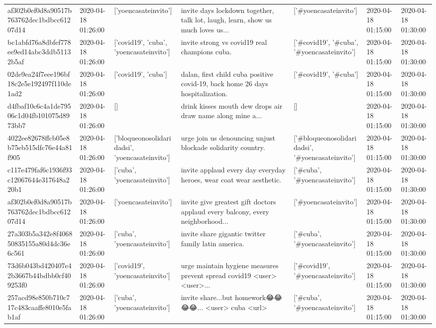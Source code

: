 \begin{tabular}{lllllll}
af302b0ef0d8a90517b763762dec1bdbcc61207d14 & 2020-04-18 01:26:00 & ['yoencasateinvito'] & invite days lockdown together, talk lot, laugh, learn, show us much loves us... & ['#yoencasateinvito'] & 2020-04-18 01:15:00 & 2020-04-18 01:30:00 \\
bc1abfd76a8dbfef778ee9ed14abc3ddb51132b5af & 2020-04-18 01:26:00 & ['covid19', 'cuba', 'yoencasateinvito'] & invite strong vs covid19 real champions cuba. & ['#covid19', '#cuba', '#yoencasateinvito'] & 2020-04-18 01:15:00 & 2020-04-18 01:30:00 \\
02de9ea24f7eee196bf18c2e5e192497f110de1ad2 & 2020-04-18 01:26:00 & ['covid19', 'cuba'] & dalan, first child cuba positive covid-19, back home 26 days hospitalization. & ['#covid19', '#cuba'] & 2020-04-18 01:15:00 & 2020-04-18 01:30:00 \\
d4fbaf10c6c4a1de79506c1d04fb101075d8973bb7 & 2020-04-18 01:26:00 & [] & drink kisses mouth dew drops air draw name along mine a... & [] & 2020-04-18 01:15:00 & 2020-04-18 01:30:00 \\
4022ee82678ffcb05e8b75eb515dfc76e44a81f905 & 2020-04-18 01:26:00 & ['bloqueonosolidaridadsi', 'yoencasateinvito'] & urge join us denouncing unjust blockade solidarity country. & ['#bloqueonosolidaridadsi', '#yoencasateinvito'] & 2020-04-18 01:15:00 & 2020-04-18 01:30:00 \\
c117e479faf6c1936f93c12067644e317648a220b1 & 2020-04-18 01:26:00 & ['cuba', 'yoencasateinvito'] & invite applaud every day everyday heroes, wear coat wear aesthetic. & ['#cuba', '#yoencasateinvito'] & 2020-04-18 01:15:00 & 2020-04-18 01:30:00 \\
af302b0ef0d8a90517b763762dec1bdbcc61207d14 & 2020-04-18 01:26:00 & ['yoencasateinvito'] & invite give greatest gift doctors applaud every balcony, every neighborhood... & ['#yoencasateinvito'] & 2020-04-18 01:15:00 & 2020-04-18 01:30:00 \\
27a303b5a342e8f406850835155a80d4dc36e6c561 & 2020-04-18 01:26:00 & ['cuba', 'yoencasateinvito'] & invite share gigantic twitter family latin america. & ['#cuba', '#yoencasateinvito'] & 2020-04-18 01:15:00 & 2020-04-18 01:30:00 \\
73d6b043bd420407e42b3667b44bdbb0cf409253f0 & 2020-04-18 01:26:00 & ['covid19', 'yoencasateinvito'] & urge maintain hygiene measures prevent spread covid19 <user> <user>... & ['#covid19', '#yoencasateinvito'] & 2020-04-18 01:15:00 & 2020-04-18 01:30:00 \\
257acd98e850b710c717c483caaffe8010e5fab1af & 2020-04-18 01:26:00 & ['cuba', 'yoencasateinvito'] & invite share...but homework😂😂😂😂... <user> cuba <url> & ['#cuba', '#yoencasateinvito'] & 2020-04-18 01:15:00 & 2020-04-18 01:30:00 \\

\end{tabular}
